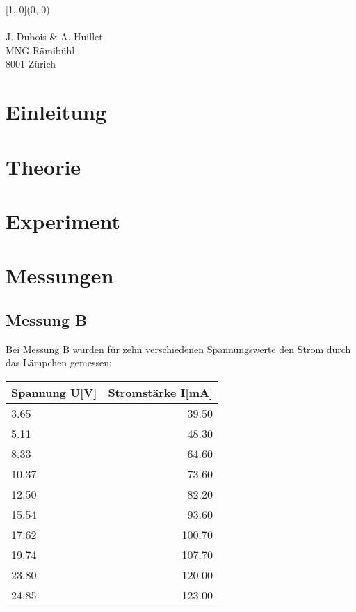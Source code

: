 \documentclass[12pt, a4paper, twoside]{article}
\begin{document}
    \begin{textblock}{\pgfmathresult}[1, 0](0, 0)
    \noindent
    \\\\ J. Dubois \& A. Huillet\\ MNG Rämibühl\\ 8001 Zürich
    \end{textblock}
    

    \newpage
    
    \section{Einleitung}
    \newpage
    \section{Theorie}
    \newpage
    \section{Experiment}
    \newpage
    \section{Messungen}
    \subsection{Messung B}
    Bei Messung B wurden für zehn verschiedenen Spannungswerte den Strom durch das Lämpchen gemessen:\\
    \begin{center}
        \begin{tabular}{l|r}
            \textbf{Spannung U[V]} & \textbf{Stromstärke I[mA]}\\
            \hline
            3.65 & 39.50\\
            5.11 & 48.30\\
            8.33 & 64.60\\
            10.37 & 73.60\\
            12.50 & 82.20\\
            15.54 & 93.60\\
            17.62 & 100.70\\
            19.74 & 107.70\\
            23.80 & 120.00\\
            24.85 & 123.00
        \end{tabular}
    \end{center}
\end{document}
